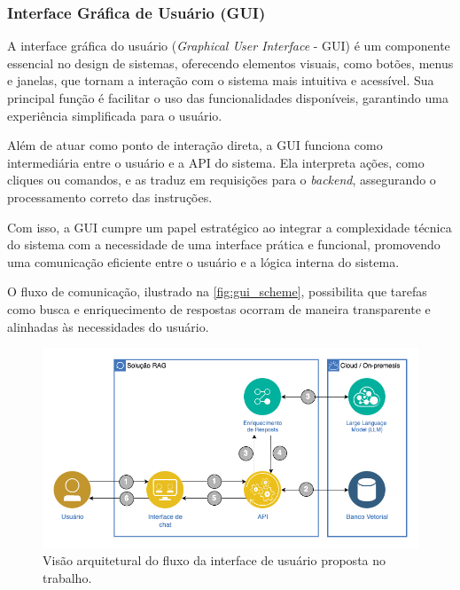 \documentclass[a4paper, 12pt]{article}
\begin{document}
    \subsubsection{Interface Gráfica de Usuário (GUI)} \label{sec:gui}
    
    A interface gráfica do usuário (\textit{Graphical User Interface} - GUI) é um componente essencial no design de sistemas, oferecendo elementos visuais, como botões, menus e janelas, que tornam a interação com o sistema mais intuitiva e acessível. Sua principal função é facilitar o uso das funcionalidades disponíveis, garantindo uma experiência simplificada para o usuário.

    Além de atuar como ponto de interação direta, a GUI funciona como intermediária entre o usuário e a API do sistema. Ela interpreta ações, como cliques ou comandos, e as traduz em requisições para o \textit{backend}, assegurando o processamento correto das instruções.
    
    Com isso, a GUI cumpre um papel estratégico ao integrar a complexidade técnica do sistema com a necessidade de uma interface prática e funcional, promovendo uma comunicação eficiente entre o usuário e a lógica interna do sistema.

    O fluxo de comunicação, ilustrado na \autoref{fig:gui_scheme}, possibilita que tarefas como busca e enriquecimento de respostas ocorram de maneira transparente e alinhadas às necessidades do usuário.

    \clearpage

    \begin{figure}[h!]
        \includegraphics[width=\textwidth,height=0.9\textheight,keepaspectratio]{architecture-solution.png}
        \centering
        \caption{Visão arquitetural do fluxo da interface de usuário proposta no trabalho.}
        \centering
        \label{fig:gui_scheme}
    \end{figure}
    
\end{document}
